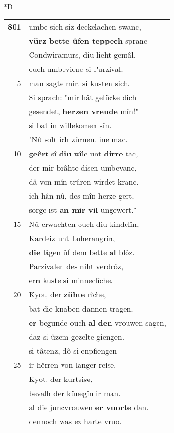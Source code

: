 \documentclass[8pt,a4paper,notitlepage]{article}
\begin{document}
\begin{table}[ht]
\begin{minipage}[t]{0.5\linewidth}
\small
\begin{center}*D
\end{center}
\begin{tabular}{rl}
\textbf{801} & umbe sich siz deckelachen swanc,\\ 
 & \textbf{vürz bette ûfen teppech} spranc\\ 
 & Condwiramurs, diu lieht gemâl.\\ 
 & ouch umbevienc si Parzival.\\ 
5 & man sagte mir, si kusten sich.\\ 
 & Si sprach: "mir hât gelücke dich\\ 
 & gesendet, \textbf{herzen vreude} mîn!"\\ 
 & si bat in willekomen sîn.\\ 
 & "Nû solt ich zürnen. ine mac.\\ 
10 & \textbf{geêrt} sî \textbf{diu} wîle unt \textbf{dirre} tac,\\ 
 & der mir brâhte disen umbevanc,\\ 
 & dâ von mîn trûren wirdet kranc.\\ 
 & ich hân nû, des mîn herze gert.\\ 
 & sorge ist \textbf{an mir vil} ungewert."\\ 
15 & Nû erwachten ouch diu kindelîn,\\ 
 & Kardeiz unt Loherangrin,\\ 
 & \textbf{die} lâgen ûf dem bette \textbf{al} blôz.\\ 
 & Parzivalen des niht verdrôz,\\ 
 & er\textbf{n} kuste si minneclîche.\\ 
20 & Kyot, der \textbf{zühte} rîche,\\ 
 & bat die knaben dannen tragen.\\ 
 & \textbf{er} begunde ouch \textbf{al den} vrouwen sagen,\\ 
 & daz si ûzem gezelte giengen.\\ 
 & si tâtenz, dô si enpfiengen\\ 
25 & ir hêrren von langer reise.\\ 
 & Kyot, der kurteise,\\ 
 & bevalh der künegîn ir man.\\ 
 & al die juncvrouwen \textbf{er vuorte} dan.\\ 
 & dennoch was ez harte vruo.\\ 

\end{tabular}
\end{minipage}
\end{table}
\end{document}
